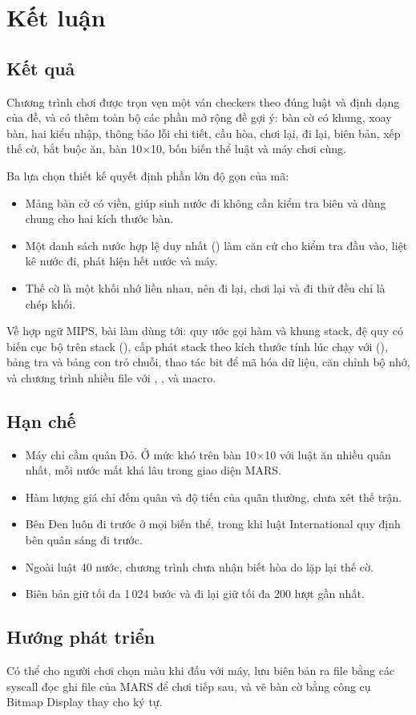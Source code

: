 \chapter{Kết luận}

\section{Kết quả}

Chương trình chơi được trọn vẹn một ván checkers theo đúng luật và định dạng của đề, và có thêm toàn bộ các phần mở rộng đề gợi ý: bàn cờ có khung, xoay bàn, hai kiểu nhập, thông báo lỗi chi tiết, cầu hòa, chơi lại, đi lại, biên bản, xếp thế cờ, bắt buộc ăn, bàn 10$\times$10, bốn biến thể luật và máy chơi cùng.

Ba lựa chọn thiết kế quyết định phần lớn độ gọn của mã:
\begin{itemize}
\item Mảng bàn cờ có viền, giúp sinh nước đi không cần kiểm tra biên và dùng chung cho hai kích thước bàn.
\item Một danh sách nước hợp lệ duy nhất () làm căn cứ cho kiểm tra đầu vào, liệt kê nước đi, phát hiện hết nước và máy.
\item Thế cờ là một khối nhớ liền nhau, nên đi lại, chơi lại và đi thử đều chỉ là chép khối.
\end{itemize}

Về hợp ngữ MIPS, bài làm dùng tới: quy ước gọi hàm và khung stack, đệ quy có biến cục bộ trên stack (), cấp phát stack theo kích thước tính lúc chạy với  (), bảng tra và bảng con trỏ chuỗi, thao tác bit để mã hóa dữ liệu, căn chỉnh bộ nhớ, và chương trình nhiều file với , ,  và macro.

\section{Hạn chế}

\begin{itemize}
\item Máy chỉ cầm quân Đỏ. Ở mức khó trên bàn 10$\times$10 với luật ăn nhiều quân nhất, mỗi nước mất khá lâu trong giao diện MARS.
\item Hàm lượng giá chỉ đếm quân và độ tiến của quân thường, chưa xét thế trận.
\item Bên Đen luôn đi trước ở mọi biến thể, trong khi luật International quy định bên quân sáng đi trước.
\item Ngoài luật 40 nước, chương trình chưa nhận biết hòa do lặp lại thế cờ.
\item Biên bản giữ tối đa 1\,024 bước và đi lại giữ tối đa 200 lượt gần nhất.
\end{itemize}

\section{Hướng phát triển}

Có thể cho người chơi chọn màu khi đấu với máy, lưu biên bản ra file bằng các syscall đọc ghi file của MARS để chơi tiếp sau, và vẽ bàn cờ bằng công cụ Bitmap Display thay cho ký tự.
